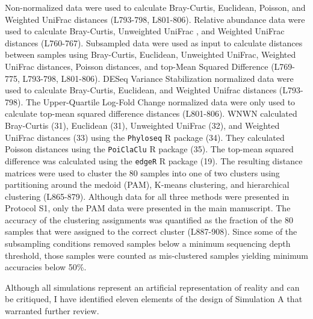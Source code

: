\documentclass[
]{article}
\begin{document}
Non-normalized data were used to calculate Bray-Curtis, Euclidean,
Poisson, and Weighted UniFrac distances (L793-798, L801-806). Relative
abundance data were used to calculate Bray-Curtis, Unweighted UniFrac ,
and Weighted UniFrac distances (L760-767). Subsampled data were used as
input to calculate distances between samples using Bray-Curtis,
Euclidean, Unweighted UniFrac, Weighted UniFrac distances, Poisson
distances, and top-Mean Squared Difference (L769-775, L793-798,
L801-806). DESeq Variance Stabilization normalized data were used to
calculate Bray-Curtis, Euclidean, and Weighted Unifrac distances
(L793-798). The Upper-Quartile Log-Fold Change normalized data were only
used to calculate top-mean squared difference distances (L801-806). WNWN
calculated Bray-Curtis (31), Euclidean (31), Unweighted UniFrac (32),
and Weighted UniFrac distances (33) using the \texttt{Phyloseq} R
package (34). They calculated Poisson distances using the
\texttt{PoiClaClu} R package (35). The top-mean squared difference was
calculated using the \texttt{edgeR} R package (19). The resulting
distance matrices were used to cluster the 80 samples into one of two
clusters using partitioning around the medoid (PAM), K-means clustering,
and hierarchical clustering (L865-879). Although data for all three
methods were presented in Protocol S1, only the PAM data were presented
in the main manuscript. The accuracy of the clustering assignments was
quantified as the fraction of the 80 samples that were assigned to the
correct cluster (L887-908). Since some of the subsampling conditions
removed samples below a minimum sequencing depth threshold, those
samples were counted as mis-clustered samples yielding minimum
accuracies below 50\%.

Although all simulations represent an artificial representation of
reality and can be critiqued, I have identified eleven elements of the
design of Simulation A that warranted further review.
\end{document}
